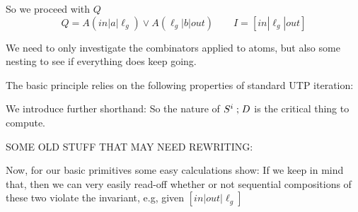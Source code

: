 So we proceed with $Q$
\[
  Q = A(in|a|\ell_g) \lor A(\ell_g|b|out)
  \qquad
  I = [in|\ell_g|out]
\]










\newpage
{}


\newpage


We need to only investigate the combinators
applied to atoms, but also some nesting to see if everything
does keep going.

The basic principle relies on the following properties of
standard UTP iteration:

We introduce further shorthand:
So the nature of $S^i\mathrel{;} D$ is the critical thing to compute.


SOME OLD STUFF THAT MAY NEED REWRITING:

Now, for our basic primitives some easy calculations show:
If we keep in mind that,
then we can very easily read-off whether or not sequential compositions
of these two violate the invariant, e.g, given $[in|out|\ell_g]$
